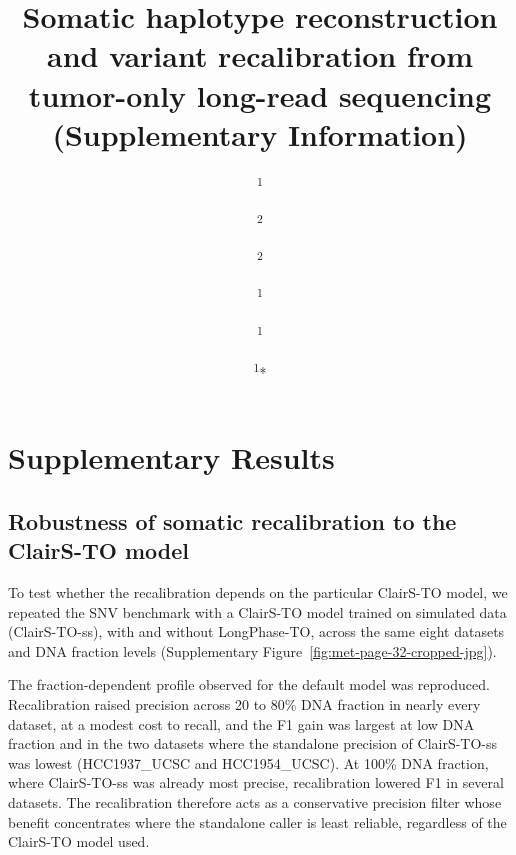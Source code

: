 \documentclass[pdflatex,sn-nature]{sn-jnl}
\begin{document}
\title{Somatic haplotype reconstruction and variant recalibration from tumor-only long-read sequencing (Supplementary Information)}

\author{ \textsuperscript{1}}
\author{ \textsuperscript{2}}
\author{ \textsuperscript{2}}
\author{ \textsuperscript{1}}
\author{ \textsuperscript{1}}
\author*{ \textsuperscript{1}*}


\maketitle

\tableofcontents

\listoffigures

\listoftables
\clearpage

\section{Supplementary Results}

\subsection{Robustness of somatic recalibration to the ClairS-TO model}\label{characterization-of-the-precision-recall-trade-off-using-simulation-trained-models}

To test whether the recalibration depends on the particular ClairS-TO model, we repeated the SNV benchmark with a ClairS-TO model trained on simulated data (ClairS-TO-ss), with and without LongPhase-TO, across the same eight datasets and DNA fraction levels (Supplementary Figure~\ref{fig:met-page-32-cropped-jpg}).

The fraction-dependent profile observed for the default model was reproduced. Recalibration raised precision across 20 to 80\% DNA fraction in nearly every dataset, at a modest cost to recall, and the F1 gain was largest at low DNA fraction and in the two datasets where the standalone precision of ClairS-TO-ss was lowest (HCC1937\_UCSC and HCC1954\_UCSC). At 100\% DNA fraction, where ClairS-TO-ss was already most precise, recalibration lowered F1 in several datasets. The recalibration therefore acts as a conservative precision filter whose benefit concentrates where the standalone caller is least reliable, regardless of the ClairS-TO model used.
\end{document}
